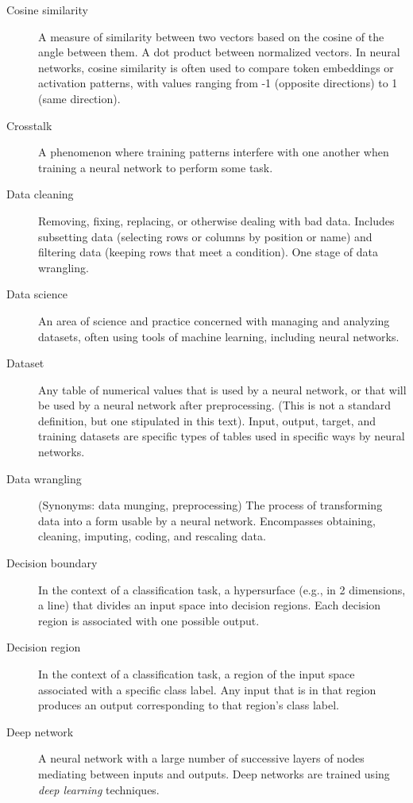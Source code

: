 \begin{description}
\item[Cosine similarity] A measure of similarity between two vectors based on the cosine of the angle between them. A dot product between normalized vectors. In neural networks, cosine similarity is often used to compare token embeddings or activation patterns, with values ranging from -1 (opposite directions) to 1 (same direction).

\item[Crosstalk] A phenomenon where training patterns interfere with one another when training a neural network to perform some task.

\item[Data cleaning] Removing, fixing, replacing, or otherwise dealing with bad data. Includes subsetting data (selecting rows or columns by position or name) and filtering data (keeping rows that meet a condition). One stage of data wrangling.

\item[Data science]  An area of science and practice concerned with managing and analyzing datasets, often using tools of machine learning, including neural networks.

\item[Dataset] Any table of numerical values that is used by a neural network, or that will be used by a neural network after preprocessing. (This is not a standard definition, but one stipulated in this text). Input, output, target, and training datasets are specific types of tables used in specific ways by neural networks.

\item[Data wrangling] (Synonyms: data munging, preprocessing) The process of transforming data into a form usable by a neural network. Encompasses obtaining, cleaning, imputing, coding, and rescaling data.

\item[Decision boundary] In the context of a classification task, a hypersurface (e.g., in 2 dimensions, a line) that divides an input space into decision regions. Each decision region is associated with one possible output.

\item[Decision region] In the context of a classification task, a region of the input space associated with a specific class label. Any input that is in that region produces an output corresponding to that region's class label.

\item[Deep network] A neural network with a large number of successive layers of nodes mediating between inputs and outputs. Deep networks are trained using \emph{deep learning} techniques.


\end{description}
